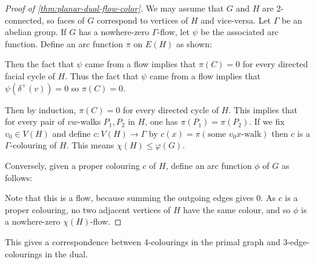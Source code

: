 \documentclass[main.tex]{subfiles}
\begin{document}
\begin{proof}[Proof of \th\ref{thm:planar-dual-flow-color}]
  We may assume that $G$ and $H$ are 2-connected, so faces of $G$ correspond
  to vertices of $H$ and vice-versa.
  Let $\Gamma$ be an abelian group.
  If $G$ has a nowhere-zero $\Gamma$-flow, let $\psi$ be the associated arc
  function.
  Define an arc function $\pi$ on $E(H)$ as shown:
  \begin{center}
  \end{center}
  Then the fact that $\psi$ came from a flow implies that $\pi(C) = 0$ for
  every directed facial cycle of $H$.
  Thus the fact that $\psi$ came from a flow implies that $\psi(\delta^+(v)) = 0$
  so $\pi(C) = 0$.

  Then by induction, $\pi(C) = 0$ for every directed cycle of $H$.
  This implies that for every pair of $vw$-walks $P_1,P_2$ in $H$,
  one has $\pi(P_1) = \pi(P_2)$.
  If we fix $v_0\in V(H)$ and define $c:V(H)\to\Gamma$ by
  $c(x) = \pi(\text{some $v_0x$-walk})$ then $c$ is a $\Gamma$-colouring of $H$.
  This means $\chi(H)\leq\varphi(G)$.

  Conversely, given a proper colouring $c$ of $H$,
  define an arc function $\phi$ of $G$ as follows:
  \begin{center}
  \end{center}
  Note that this is a flow, because summing the outgoing edges gives 0.
  As $c$ is a proper colouring, no two adjacent vertices of $H$ have the same
  colour, and so $\phi$ is a nowhere-zero $\chi(H)$-flow.
\end{proof}
\begin{remark*}
  This gives a correspondence between 4-colourings in the primal graph
  and 3-edge-colourings in the dual.
\end{remark*}
\end{document}
